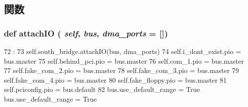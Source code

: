 \subsection{関数}
\hypertarget{classPc_1_1Pc_ac750675f6d6de3ad52f8c5b03ee45a65}{
\subsubsection[{attachIO}]{\setlength{\rightskip}{0pt plus 5cm}def attachIO ( {\em self}, \/   {\em bus}, \/   {\em dma\_\-ports} = {\ttfamily \mbox{[}\mbox{]}})}}
\label{classPc_1_1Pc_ac750675f6d6de3ad52f8c5b03ee45a65}



\begin{DoxyCode}
72                                            :
73         self.south_bridge.attachIO(bus, dma_ports)
74         self.i_dont_exist.pio = bus.master
75         self.behind_pci.pio = bus.master
76         self.com_1.pio = bus.master
77         self.fake_com_2.pio = bus.master
78         self.fake_com_3.pio = bus.master
79         self.fake_com_4.pio = bus.master
80         self.fake_floppy.pio = bus.master
81         self.pciconfig.pio = bus.default
82         bus.use_default_range = True
        bus.use_default_range = True
\end{DoxyCode}



